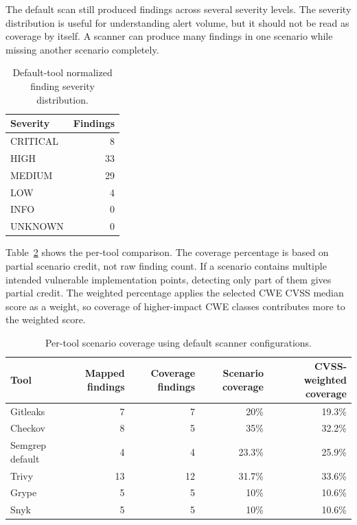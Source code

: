 The default scan still produced findings across several severity levels. The severity distribution is useful for understanding alert volume, but it should not be read as coverage by itself. A scanner can produce many findings in one scenario while missing another scenario completely.

\begin{table}[H]
\centering
\caption{Default-tool normalized finding severity distribution.}
\label{tab:default-normalized-severity-distribution}
\begin{tabular}{lr}
\hline
Severity & Findings \\
\hline
CRITICAL & 8 \\
HIGH & 33 \\
MEDIUM & 29 \\
LOW & 4 \\
INFO & 0 \\
UNKNOWN & 0 \\
\hline
\end{tabular}
\end{table}

Table~\ref{tab:default-per-tool-coverage-results} shows the per-tool comparison. The coverage percentage is based on partial scenario credit, not raw finding count. If a scenario contains multiple intended vulnerable implementation points, detecting only part of them gives partial credit. The weighted percentage applies the selected CWE CVSS median score as a weight, so coverage of higher-impact CWE classes contributes more to the weighted score.

\begin{table}[H]
\centering
\caption{Per-tool scenario coverage using default scanner configurations.}
\label{tab:default-per-tool-coverage-results}
\begin{tabular}{lrrrr}
\hline
Tool & Mapped findings & Coverage findings & Scenario coverage & CVSS-weighted coverage \\
\hline
Gitleaks & 7 & 7 & 20\% & 19.3\% \\
Checkov & 8 & 5 & 35\% & 32.2\% \\
Semgrep default & 4 & 4 & 23.3\% & 25.9\% \\
Trivy & 13 & 12 & 31.7\% & 33.6\% \\
Grype & 5 & 5 & 10\% & 10.6\% \\
Snyk & 5 & 5 & 10\% & 10.6\% \\
\hline
\end{tabular}
\end{table}

